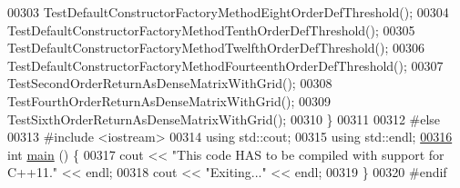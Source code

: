 \begin{DoxyCode}
00303   TestDefaultConstructorFactoryMethodEightOrderDefThreshold();
00304   TestDefaultConstructorFactoryMethodTenthOrderDefThreshold();
00305   TestDefaultConstructorFactoryMethodTwelfthOrderDefThreshold();
00306   TestDefaultConstructorFactoryMethodFourteenthOrderDefThreshold();
00307   TestSecondOrderReturnAsDenseMatrixWithGrid();
00308   TestFourthOrderReturnAsDenseMatrixWithGrid();
00309   TestSixthOrderReturnAsDenseMatrixWithGrid();
00310 \}
00311 
00312 \textcolor{preprocessor}{#else}
00313 \textcolor{preprocessor}{#include <iostream>}
00314 \textcolor{keyword}{using} std::cout;
00315 \textcolor{keyword}{using} std::endl;
\hypertarget{mtk__div__1d__test_8cc_source_l00316}{}\hyperlink{mtk__div__1d__test_8cc_ae66f6b31b5ad750f1fe042a706a4e3d4}{00316} \textcolor{keywordtype}{int} \hyperlink{mtk__div__1d__test_8cc_ae66f6b31b5ad750f1fe042a706a4e3d4}{main} () \{
00317   cout << \textcolor{stringliteral}{"This code HAS to be compiled with support for C++11."} << endl;
00318   cout << \textcolor{stringliteral}{"Exiting..."} << endl;
00319 \}
00320 \textcolor{preprocessor}{#endif}
\end{DoxyCode}
